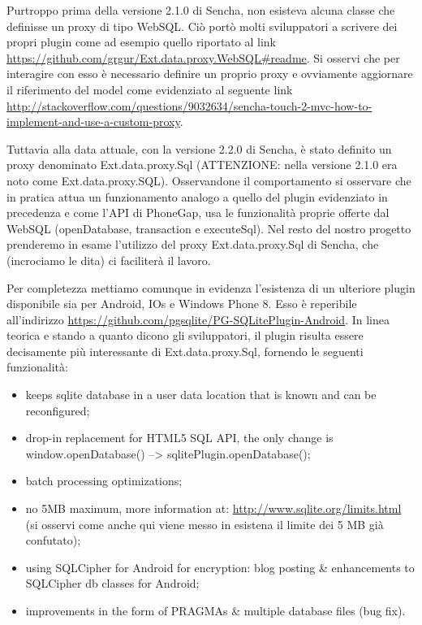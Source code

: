 \documentclass[10pt,a4paper,onecolumn]{article}
\begin{document}
Purtroppo prima della versione 2.1.0 di Sencha, non esisteva alcuna classe che definisse un proxy di tipo WebSQL. Ciò portò molti sviluppatori a scrivere dei propri plugin come ad esempio quello riportato al link \url{https://github.com/grgur/Ext.data.proxy.WebSQL#readme}. Si osservi che per interagire con esso è necessario definire un proprio proxy e ovviamente aggiornare il riferimento del model come evidenziato al seguente link \url{http://stackoverflow.com/questions/9032634/sencha-touch-2-mvc-how-to-implement-and-use-a-custom-proxy}.

Tuttavia alla data attuale, con la versione 2.2.0 di Sencha, è stato definito un proxy denominato Ext.data.proxy.Sql (ATTENZIONE: nella versione 2.1.0 era noto come Ext.data.proxy.SQL). Osservandone il comportamento si osservare che in pratica attua un funzionamento analogo a quello del plugin evidenziato in precedenza e come l'API di PhoneGap, usa le funzionalità proprie offerte dal WebSQL (openDatabase, transaction e executeSql). Nel resto del nostro progetto prenderemo in esame l'utilizzo del proxy Ext.data.proxy.Sql di Sencha, che (incrociamo le dita) ci faciliterà il lavoro.

Per completezza mettiamo comunque in evidenza l'esistenza di un ulteriore plugin disponibile sia per Android, IOs e Windows Phone 8. Esso è reperibile all'indirizzo \url{https://github.com/pgsqlite/PG-SQLitePlugin-Android}. In linea teorica e stando a quanto dicono gli sviluppatori, il plugin risulta essere decisamente più interessante di Ext.data.proxy.Sql, fornendo le seguenti funzionalità:

\begin{itemize}
	\item keeps sqlite database in a user data location that is known and can be reconfigured;
	\item drop-in replacement for HTML5 SQL API, the only change is window.openDatabase() --> sqlitePlugin.openDatabase();
	\item batch processing optimizations;
	\item no 5MB maximum, more information at: \url{http://www.sqlite.org/limits.html} (si osservi come anche qui viene messo in esistena il limite dei 5 MB già confutato);
	\item using SQLCipher for Android for encryption: blog posting \& enhancements to SQLCipher db classes for Android;
	\item improvements in the form of PRAGMAs \& multiple database files (bug fix).
\end{itemize}
\end{document}

